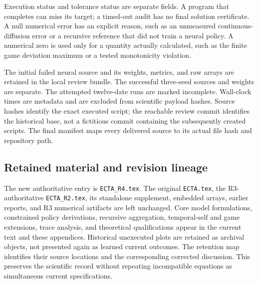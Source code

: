 Execution status and tolerance status are separate fields. A program that completes can miss its target; a timed-out audit has no final solution certificate. A null numerical error has an explicit reason, such as an unmeasured continuous-diffusion error or a recursive reference that did not train a neural policy. A numerical zero is used only for a quantity actually calculated, such as the finite game deviation maximum or a tested monotonicity violation.

The initial failed neural source and its weights, metrics, and raw arrays are retained in the local review bundle. The successful three-seed sources and weights are separate. The attempted twelve-date runs are marked incomplete. Wall-clock times are metadata and are excluded from scientific payload hashes. Source hashes identify the exact executed script; the reachable review commit identifies the historical base, not a fictitious commit containing the subsequently created scripts. The final manifest maps every delivered source to its actual file hash and repository path.

\subsection{Retained material and revision lineage}
The new authoritative entry is \texttt{ECTA\_R4.tex}. The original \texttt{ECTA.tex}, the R3-authoritative \texttt{ECTA\_R2.tex}, its standalone supplement, embedded arrays, earlier reports, and R3 numerical artifacts are left unchanged. Core model formulations, constrained policy derivations, recursive aggregation, temporal-self and game extensions, trace analysis, and theoretical qualifications appear in the current text and these appendices. Historical unexecuted plots are retained as archival objects, not presented again as learned current outcomes. The retention map identifies their source locations and the corresponding corrected discussion. This preserves the scientific record without repeating incompatible equations as simultaneous current specifications.
